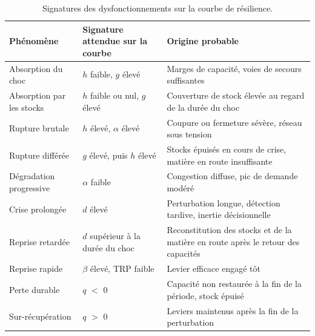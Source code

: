 \begin{table}[htbp]
\caption{Signatures des dysfonctionnements sur la courbe de résilience.}
\label{tab:S3}
\footnotesize
\begin{tabularx}{\textwidth}{@{}LLL@{}}
\toprule
\textbf{Phénomène} & \textbf{Signature attendue sur la courbe} & \textbf{Origine probable} \\
\midrule
Absorption du choc & $h$ faible, $g$ élevé & Marges de capacité, voies de secours suffisantes \\
Absorption par les stocks & $h$ faible ou nul, $g$ élevé & Couverture de stock élevée au regard de la durée du choc \\
Rupture brutale & $h$ élevé, $\alpha$ élevé & Coupure ou fermeture sévère, réseau sous tension \\
Rupture différée & $g$ élevé, puis $h$ élevé & Stocks épuisés en cours de crise, matière en route insuffisante \\
Dégradation progressive & $\alpha$ faible & Congestion diffuse, pic de demande modéré \\
Crise prolongée & $d$ élevé & Perturbation longue, détection tardive, inertie décisionnelle \\
Reprise retardée & $d$ supérieur à la durée du choc & Reconstitution des stocks et de la matière en route après le retour des capacités \\
Reprise rapide & $\beta$ élevé, TRP faible & Levier efficace engagé tôt \\
Perte durable & $q$ $<$ 0 & Capacité non restaurée à la fin de la période, stock épuisé \\
Sur-récupération & $q$ $>$ 0 & Leviers maintenus après la fin de la perturbation \\
\bottomrule
\end{tabularx}
\end{table}
